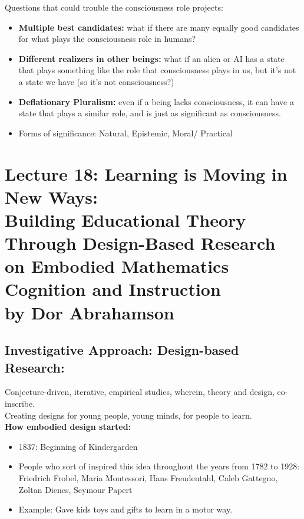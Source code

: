 \documentclass{article}
\begin{document}
Questions that could trouble the consciousness role projects: 
\begin{itemize}
    \item \textbf{Multiple best candidates:} what if there are many equally good candidates for what plays the consciousness role in humans? 
    \item \textbf{Different realizers in other beings:} what if an alien or AI has a state that plays something like the role that consciousness plays in us, but it's not a state we have (so it's not consciousness?)
    \item \textbf{Deflationary Pluralism:} even if a being lacks consciousness, it can have a state that plays a similar role, and is just as significant as consciousness. 
    \item Forms of significance: Natural, Epistemic, Moral/ Practical
\end{itemize}

\section{Lecture 18: Learning is Moving in New Ways: \\ Building Educational Theory Through Design-Based Research on Embodied Mathematics Cognition and Instruction \\ by Dor Abrahamson}

\subsection{Investigative Approach: Design-based Research: }
Conjecture-driven, iterative, empirical studies, wherein, theory and design, co-inscribe. \\
Creating designs for young people, young minds, for people to learn. \\

\textbf{How embodied design started:}\\
\begin{itemize}
    \item 1837: Beginning of Kindergarden 
    \item People who sort of inspired this idea throughout the years from 1782 to 1928: Friedrich Frobel, Maria Montessori, Hans Freudentahl, Caleb Gattegno, Zoltan Dienes, Seymour Papert
    \item Example: Gave kids toys and gifts to learn in a motor way.
\end{itemize}
\end{document}
